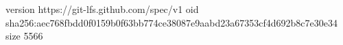 version https://git-lfs.github.com/spec/v1
oid sha256:aec768fbdd0f0159b0f63bb774ce38087e9aabd23a67353cf4d692b8c7e30e34
size 5566
